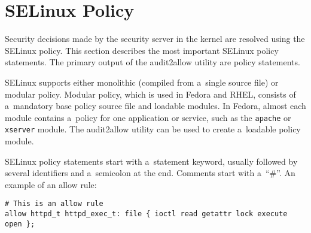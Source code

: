\section{SELinux Policy}
\label{policy}
Security decisions made by the security server in the kernel are resolved using
the SELinux policy. This section describes the most important SELinux policy
statements. The primary output of the audit2allow utility are policy statements.

SELinux supports either monolithic (compiled from a~single source file) or
modular policy. Modular policy, which is used in Fedora and RHEL, consists of
a~mandatory base policy source file and loadable modules. In Fedora, almost
each module contains a~policy for one application or service, such as the
\texttt{apache} or \texttt{xserver} module. The audit2allow utility can be used
to create a~loadable policy module.

SELinux policy statements start with a~statement keyword, usually followed by
several identifiers and a~semicolon at the end. Comments start with a~``\#''.
An example of an allow rule:
\begin{lstlisting}[language=te]
# This is an allow rule
allow httpd_t httpd_exec_t: file { ioctl read getattr lock execute open };
\end{lstlisting}

